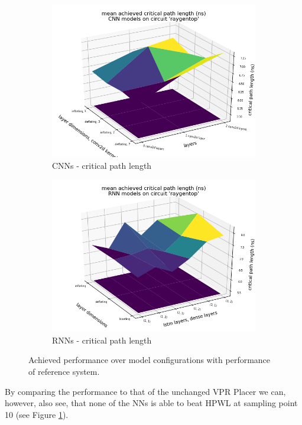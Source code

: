 \begin{figure}
\begin{subfigure}[b]{0.45\linewidth}
		\includegraphics[width=\linewidth]{plots/cnn-hyperopt-critical-path-with-reference.png}
		\caption{\glspl{CNN} - critical path length}
	\end{subfigure}
	\begin{subfigure}[b]{0.45\linewidth}
		\includegraphics[width=\linewidth]{plots/rnn-hyperopt-critical-path-with-reference.png}
		\caption{\glspl{RNN} - critical path length}
	\end{subfigure}
	\caption{Achieved performance over model configurations with performance of reference system.}
	\label{fig:eval-hyperopt-surface-reference}
\end{figure}

By comparing the performance to that of the unchanged \gls{VPR} Placer we can, however, also see, that none of the \glspl{NN} is able to beat \gls{HPWL} at sampling point 10 (see Figure \ref{fig:eval-hyperopt-surface-reference}).


